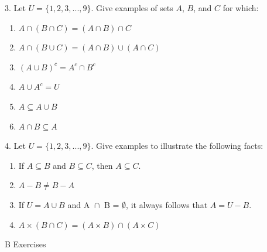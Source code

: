 \documentclass[10pt,]{book}
\theoremstyle{plain}
\theoremstyle{definition}
\begin{document}
\begin{exercisegroup}
\begin{multicols}{2}
\end{multicols}
\par\smallskip
\item[3.]\hypertarget{exercise-9}{}  Let \(U= \{1, 2, 3, . . . , 9\}\). 
Give examples of sets \( A\), \( B\), and \( C\) for which:
\leavevmode%
\begin{multicols}{2}
\begin{enumerate}[label=(\alph*)]
\item\hypertarget{li-84}{}  \(A\cap (B\cap C)=(A\cap B)\cap C\) \item\hypertarget{li-85}{}  \(A\cap (B\cup C)=(A\cap B)\cup (A\cap C)\)\item\hypertarget{li-86}{}  \((A \cup  B)^c= A^c\cap B^c\) \item\hypertarget{li-87}{}  \(A \cup  A^c = U\)\item\hypertarget{li-88}{}  \(A \subseteq A\cup B\)\item\hypertarget{li-89}{}  \(A\cap B \subseteq A\) \end{enumerate}
\end{multicols}
\par\smallskip
\item[4.]\hypertarget{exercise-10}{}  Let \(U= \{1, 2, 3, . . . , 9\}\). Give examples to illustrate the following facts: 
\leavevmode%
\begin{multicols}{1}
\begin{enumerate}[label=(\alph*)]
\item\hypertarget{li-90}{}  If \(A \subseteq  B\) and \(B \subseteq C\), then \(A\subseteq C\).\item\hypertarget{li-91}{}  \(A - B \neq  B - A\) \item\hypertarget{li-92}{}  If \(U = A\cup  B\) and \(\text{A $\cap $ B = $\emptyset $}\), it always follows that \(A = U - B\). \item\hypertarget{li-93}{}  \(A \times  (B\cap C) = (A \times  B)\cap  (A \times C)\)   \end{enumerate}
\end{multicols}
\par\smallskip
\end{exercisegroup}
\par\smallskip\noindent
\hypertarget{exercisegroup-4}{}\typeout{************************************************}
\typeout{************************************************}
B Exercises%
\end{document}
